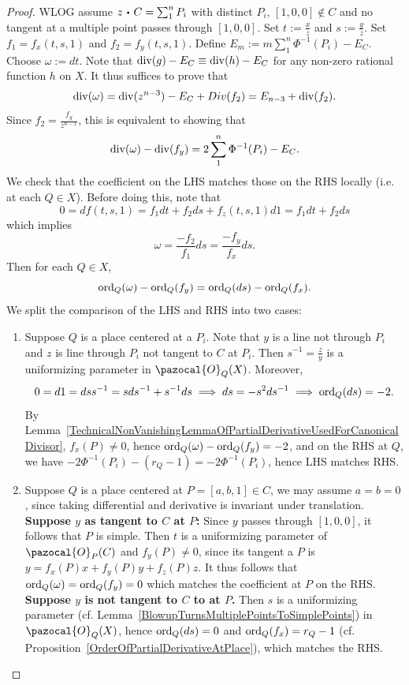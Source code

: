     \begin{proof}
        WLOG assume $z\ic C = \sum_1^n P_i$ with distinct $P_i$, $[1,0,0]\notin C$ and no tangent at a multiple point passes through $[1,0,0]$.  Set $t := \frac{x}{z}$ and $s := \frac{y}{z}$. Set $f_1 = f_x(t,s,1)$ and $f_2 = f_y(t,s,1).$ Define $E_m := m \sum_1^n \Phi^{-1}(P_i) - E_C$. Choose $\omega := dt$. Note that $\mathrm{div}(g)-E_C \equiv \mathrm{div}(h)-E_C$ for any non-zero rational function $h$ on $X$. It thus suffices to prove that 
        $$
            \mathrm{div}(\omega) = \mathrm{div}(z^{n-3})-E_C+Div(f_2) = E_{n-3}+\mathrm{div}(f_2).
        $$
        Since $f_2 = \frac{f_y}{z^{n-1}}$, this is equivalent to showing that 
        $$
            \mathrm{div}(\omega) -\mathrm{div}(f_y) = 2\sum_1^n \Phi^{-1}(P_i) - E_C.
        $$ 
        We check that the coefficient on the LHS matches those on the RHS locally (i.e. at each $Q\in X$). Before doing this, note that 
        $$
            0 = df(t,s,1) = f_1dt+f_2ds+f_z(t,s,1)d1 = f_1dt+f_2ds
        $$
        which implies 
        $$
            \omega = \frac{-f_2}{f_1}ds = \frac{-f_y}{f_x}ds. 
        $$
        Then for each $Q\in X$,
        $$
            \mathrm{ord}_Q(\omega) -\mathrm{ord}_Q(f_y) = \mathrm{ord}_Q(ds)-\mathrm{ord}_Q(f_x).
        $$
        We split the comparison of the LHS and RHS into two cases: 
        \begin{enumerate}
            \item Suppose $Q$ is a place centered at a $P_i$. Note that $y$ is a line not through $P_i$ and $z$ is line through $P_i$ not tangent to $C$ at $P_i$. Then $s^{-1}=\frac{z}{y}$ is a uniformizing parameter in $\pazocal{O}_Q(X)$. Moreover,
            $$
                0 = d1 = d ss^{-1} = sds^{-1} + s^{-1}ds \implies ds = -s^2 ds^{-1} \implies \mathrm{ord}_Q(ds) = -2.
            $$
            By Lemma~\ref{TechnicalNonVanishingLemmaOfPartialDerivativeUsedForCanonicalDivisor}, $f_x(P)\neq 0$, hence 
            $\mathrm{ord}_Q(\omega)-\mathrm{ord}_Q(f_y) = -2$, and on the RHS at $Q$, we have $-2\Phi^{-1}(P_i)-(r_Q-1) = -2\Phi^{-1}(P_i)$, hence LHS matches RHS.
            \item Suppose $Q$ is a place centered at $P= [a,b,1]\in C$, we may assume $a=b=0$, since taking differential and derivative is invariant under translation.\\
            \textbf{Suppose $y$ as tangent to $C$ at $P$:} Since $y$ passes through $[1,0,0]$, it follows that $P$ is simple. Then $t$ is a uniformizing parameter of $\pazocal{O}_P(C)$ and $f_y(P)\neq 0$, since its tangent a $P$ is $y= f_x(P)x+f_y(P)y+f_z(P)z$. It thus follows that $\mathrm{ord}_Q(\omega) = \mathrm{ord}_Q(f_y) = 0$ which matches the coefficient at $P$ on the RHS.\\
            \textbf{Suppose $y$ is not tangent to $C$ to at $P$.} Then $s$ is a uniformizing parameter (cf. Lemma~\ref{BlowupTurnsMultiplePointsToSimplePoints}) in $\pazocal{O}_Q(X)$, hence $\mathrm{ord}_Q(ds) = 0$ and $\mathrm{ord}_Q(f_x)= r_Q -1$ (cf. Proposition~\ref{OrderOfPartialDerivativeAtPlace}), which matches the RHS.   
        \end{enumerate}
    \end{proof}
